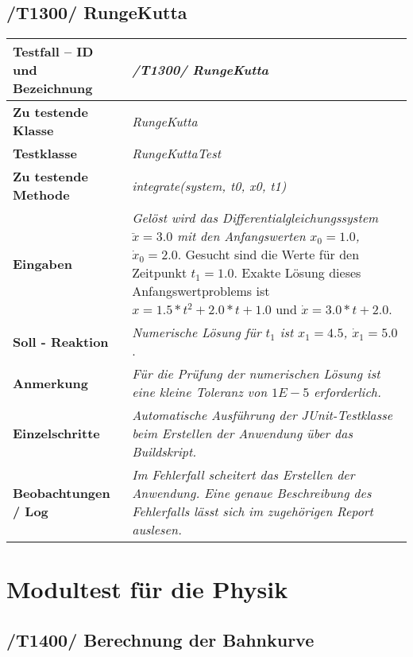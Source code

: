\subsection{/T1300/ RungeKutta}

\begin{longtable}{|p{7cm}|p{10cm}|}
\hline
\textbf{Testfall -- ID und Bezeichnung} &  \textit{/T1300/ RungeKutta} \\
\hline
\textbf{Zu testende Klasse} &  \textit{RungeKutta} \\
\hline
\textbf{Testklasse} &  \textit{RungeKuttaTest} \\
\hline
\textbf{Zu testende Methode} &  \textit{integrate(system, t0, x0, t1)}\\
\hline
\textbf{Eingaben} & \textit{Gelöst wird das Differentialgleichungssystem $\ddot{x} = 3.0$ mit
den Anfangswerten $x_0 = 1.0$, $\dot{x}_0 = 2.0$}. Gesucht sind die Werte für den Zeitpunkt
$t_1 = 1.0$. Exakte Lösung dieses Anfangswertproblems ist $x = 1.5 * t^2 + 2.0 * t + 1.0$ und $\dot{x} = 3.0 * t + 2.0$. \\
\hline
\textbf{Soll - Reaktion} & \textit{Numerische Lösung für $t_1$ ist $x_1 = 4.5$, $\dot{x}_1 = 5.0$}. \\
\hline
\textbf{Anmerkung} & \textit{Für die Prüfung der numerischen Lösung ist eine kleine 
Toleranz von $1E-5$ erforderlich.} \\
\hline
\textbf{Einzelschritte} &  \textit{Automatische Ausführung der JUnit-Testklasse beim Erstellen
der Anwendung über das Buildskript.} \\
\hline
\textbf{Beobachtungen / Log} &  \textit{Im Fehlerfall scheitert das Erstellen der Anwendung.
Eine genaue Beschreibung des Fehlerfalls lässt sich im zugehörigen Report auslesen.} \\
\hline
\end{longtable}

\section{Modultest für die Physik}
\subsection{/T1400/ Berechnung der Bahnkurve}

